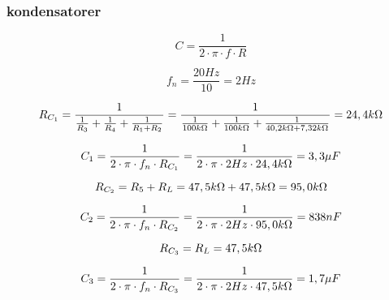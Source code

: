 


\subsubsection*{kondensatorer}



\begin{equation}
C = \frac{1}{2 \cdot \pi \cdot f \cdot R}
\end{equation}

\begin{equation}
f_n = \frac{20 Hz}{10} = 2 Hz
\end{equation}

\begin{equation}
R_{C_1} = \frac{1}{\frac{1}{R_3} + \frac{1}{R_4} + \frac{1}{R_1 + R_2}} = \frac{1}{\frac{1}{100 k\ohm} + \frac{1}{100 k\ohm} + \frac{1}{40,2 k\ohm + 7,32 k\ohm}} = 24,4 k\ohm
\end{equation}

\begin{equation}
C_1 = \frac{1}{2 \cdot \pi \cdot f_n \cdot R_{C_1}} = \frac{1}{2 \cdot \pi \cdot 2 Hz \cdot 24,4 k\ohm} = 3,3 \mu F
\end{equation}

\begin{equation}
R_{C_2} = R_5 + R_L = 47,5 k\ohm + 47,5 k\ohm = 95,0 k\ohm
\end{equation}

\begin{equation}
C_2 = \frac{1}{2 \cdot \pi \cdot f_n \cdot R_{C_2} } = \frac{1}{2 \cdot \pi \cdot 2 Hz \cdot 95,0 k\ohm} = 838 nF
\end{equation}

\begin{equation}
R_{C_3} = R_L = 47,5 k\ohm
\end{equation}

\begin{equation}
C_3 = \frac{1}{2 \cdot \pi \cdot f_n \cdot R_{C_3} } = \frac{1}{2 \cdot \pi \cdot 2 Hz \cdot 47,5 k\ohm} = 1,7 \mu F
\end{equation}